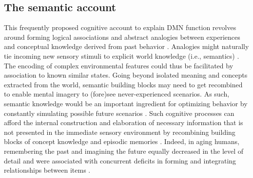 \documentclass[10pt,letterpaper]{article}
\begin{document}
\subsection{The semantic account}
This frequently proposed cognitive account to explain DMN function revolves
around forming logical associations and abstract analogies between
experiences and conceptual knowledge derived from past behavior
\citep{bar2007proactive, binder1999conceptual, constantinescu2016organizing}.
Analogies might naturally tie incoming new sensory stimuli to
explicit world knowledge (i.e., semantics)
\citep{bar2009proactive}.
The encoding of complex environmental features could thus be facilitated
by association to known similar states.
%
Going beyond isolated meaning and concepts extracted from the world,
semantic building blocks may need to get recombined to enable
mental imagery to (fore)see never-experienced scenarios.
As such, semantic knowledge would be an important ingredient for optimizing behavior
by constantly simulating possible future scenarios
\citep{boyer2008evolutionary, binder2011neurobiology}.
Such cognitive processes can afford
the internal construction and elaboration of necessary information
that is not presented in the immediate sensory environment
by recombining building blocks of
concept knowledge and episodic memories
\citep{hassabis2009construction}.
Indeed, in aging humans, remembering the past and imagining the future
equally decreased in the level of detail and were associated with
concurrent deficits in forming and integrating relationships between
items \citep{addis2008age, spreng2006temporal}.
\end{document}
